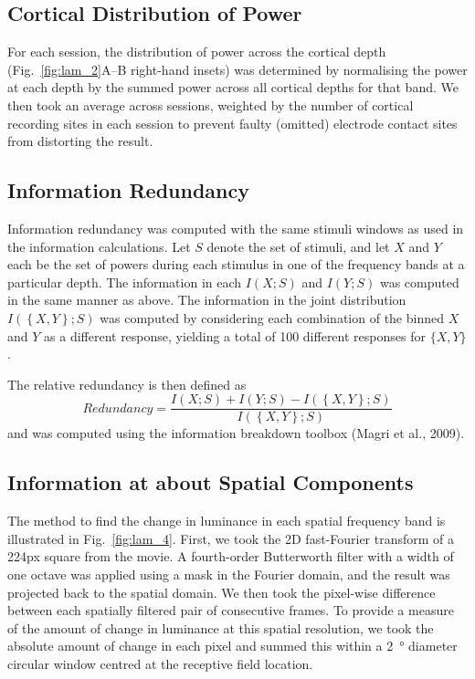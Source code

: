\subsection{Cortical Distribution of Power}
For each session, the distribution of power across the cortical depth (Fig.~\ref{fig:lam_2}A--B right-hand insets) was determined by normalising the power at each depth by the summed power across all cortical depths for that band.
We then took an average across sessions, weighted by the number of cortical recording sites in each session to prevent faulty (omitted) electrode contact sites from distorting the result.

\subsection{Information Redundancy}
Information redundancy was computed with the same stimuli windows as used in the information calculations.
Let  $S$ denote the set of stimuli, and let  $X$ and  $Y$ each be the set of powers during each stimulus in one of the frequency bands at a particular depth.
The information in each  $I\left(X;S\right)$ and  $I(Y;S)$ was computed in the same manner as above.
The information in the joint distribution  $I(\left\{X,Y\right\};S)$ was computed by considering each combination of the binned  $X$ and  $Y$ as a different response, yielding a total of 100 different responses for  $\{X,Y\}$.

The relative redundancy is then defined as
\begin{equation*}
\mathit{Redundancy}=\frac{I\left(X;S\right)+I\left(Y;S\right)-I\left(\left\{X,Y\right\};S\right)}{I\left(\left\{X,Y\right\};S\right)}
\end{equation*}
and was computed using the information breakdown toolbox (Magri et al., 2009).


\subsection{Information at about Spatial Components}
The method to find the change in luminance in each spatial frequency band is illustrated in Fig.~\ref{fig:lam_4}.
First, we took the 2D fast-Fourier transform of a 224px square from the movie.
A fourth-order Butterworth filter with a width of one octave was applied using a mask in the Fourier domain, and the result was projected back to the spatial domain.
We then took the pixel-wise difference between each spatially filtered pair of consecutive frames.
To provide a measure of the amount of change in luminance at this spatial resolution, we took the absolute amount of change in each pixel and summed this within a \SI{2}{\degree} diameter circular window centred at the receptive field location.

